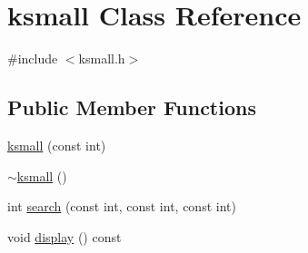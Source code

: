 \hypertarget{classksmall}{\section{ksmall Class Reference}
\label{classksmall}
}


{\ttfamily \#include $<$ksmall.\-h$>$}

\subsection*{Public Member Functions}
\begin{DoxyCompactItemize}
\item 
\hyperlink{classksmall_aaf2c956bc2a5a9d0aadb774c465e41e1}{ksmall} (const int)
\item 
\hyperlink{classksmall_ae03baaa841e924942751f41b05114563}{$\sim$ksmall} ()
\item 
int \hyperlink{classksmall_a0e699530ea1aab28330c53484903262f}{search} (const int, const int, const int)
\item 
void \hyperlink{classksmall_a169cbdea00000cbe790e01f3d710cfe9}{display} () const 
\end{DoxyCompactItemize}


